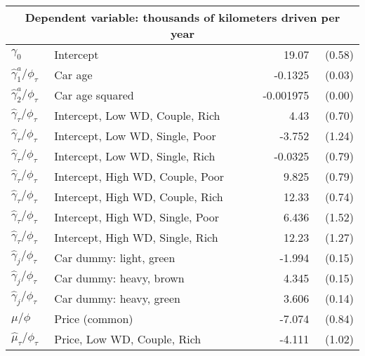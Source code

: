 \begin{tabular}{llrr} 
\toprule \multicolumn{4}{c}{Dependent variable: thousands of kilometers driven per year} \\ 
\midrule 
                              $\gamma_0$  &                                 Intercept    &         19.07    &  (0.58) \\ 
          $\hat{\gamma}^a_1 / \phi_\tau$  &                                   Car age    &       -0.1325    &  (0.03) \\ 
          $\hat{\gamma}^a_2 / \phi_\tau$  &                           Car age squared    &     -0.001975    &  (0.00) \\ 
       $\hat{\gamma}_{\tau} / \phi_\tau$  &           Intercept, Low WD, Couple, Rich    &          4.43    &  (0.70) \\ 
       $\hat{\gamma}_{\tau} / \phi_\tau$  &           Intercept, Low WD, Single, Poor    &        -3.752    &  (1.24) \\ 
       $\hat{\gamma}_{\tau} / \phi_\tau$  &           Intercept, Low WD, Single, Rich    &       -0.0325    &  (0.79) \\ 
       $\hat{\gamma}_{\tau} / \phi_\tau$  &          Intercept, High WD, Couple, Poor    &         9.825    &  (0.79) \\ 
       $\hat{\gamma}_{\tau} / \phi_\tau$  &          Intercept, High WD, Couple, Rich    &         12.33    &  (0.74) \\ 
       $\hat{\gamma}_{\tau} / \phi_\tau$  &          Intercept, High WD, Single, Poor    &         6.436    &  (1.52) \\ 
       $\hat{\gamma}_{\tau} / \phi_\tau$  &          Intercept, High WD, Single, Rich    &         12.23    &  (1.27) \\ 
            $\hat{\gamma}_j / \phi_\tau$  &                   Car dummy: light, green    &        -1.994    &  (0.15) \\ 
            $\hat{\gamma}_j / \phi_\tau$  &                   Car dummy: heavy, brown    &         4.345    &  (0.15) \\ 
            $\hat{\gamma}_j / \phi_\tau$  &                   Car dummy: heavy, green    &         3.606    &  (0.14) \\ 
                            $\mu / \phi$  &                            Price (common)    &        -7.074    &  (0.84) \\ 
          $\hat{\mu}_{\tau} / \phi_\tau$  &               Price, Low WD, Couple, Rich    &        -4.111    &  (1.02) \\ 

\end{tabular}
